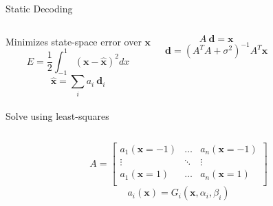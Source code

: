 \documentclass[aspectratio=169]{beamer}
\begin{document}
\begin{frame}{Static Decoding}
\begin{columns}[t]
	\centering
	Minimizes state-space error over $\mathbf{x}$
	\begin{equation*}
	    E = \frac{1}{2}\int_{-1}^1 (\mathbf{x} - \hat{\mathbf{x}})^2 dx
	\end{equation*}
	\begin{equation*}
	    \hat{\mathbf{x}} = \sum_i a_i ~\mathbf{d}_i
	\end{equation*} \\
	Solve using least-squares \\
	\vspace{0.25cm}
	\begin{minipage}{0.5\textwidth}
	\begin{equation*}
	    A ~\mathbf{d} = \mathbf{x}
	\end{equation*}
	\begin{equation*}
	    \mathbf{d} = (A^T A + \sigma^2)^{-1} A^T \mathbf{x}
	\end{equation*}
	\end{minipage}
\end{columns}
\pause
{}
\begin{equation*}
    A = \begin{bmatrix}
    a_{1}(\mathbf{x}=-1) & \dots & a_{n}(\mathbf{x}=-1) \\
    \vdots & \ddots & \vdots \\
    a_{1}(\mathbf{x}=1) & \dots & a_{n}(\mathbf{x}=1) \\
    \end{bmatrix}
\end{equation*}
\begin{equation*}
    a_i(\mathbf{x}) = G_i(\mathbf{x}, \alpha_i, \beta_i)
\end{equation*}
\end{frame}
\end{document}
